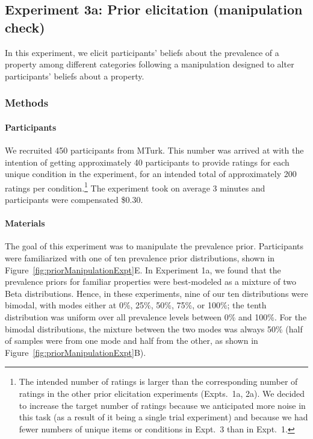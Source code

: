 \documentclass[floatsintext,man]{apa6}
\let\oldparagraph\paragraph
\renewcommand{\paragraph}[1]{\oldparagraph{#1}\mbox{}}
\let\rmarkdownfootnote\footnote%
\def\footnote{\protect\rmarkdownfootnote}
\begin{document}
\hypertarget{experiment-3a-prior-elicitation-manipulation-check}{%
\subsection{Experiment 3a: Prior elicitation (manipulation check)}\label{experiment-3a-prior-elicitation-manipulation-check}}

In this experiment, we elicit participants' beliefs about the prevalence of a property among different categories following a manipulation designed to alter participants' beliefs about a property.


\hypertarget{methods-2}{%
\subsubsection{Methods}\label{methods-2}}

\hypertarget{participants-3}{%
\paragraph{Participants}\label{participants-3}}
%
We recruited 450 participants from MTurk.
This number was arrived at with the intention of getting approximately 40 participants to provide ratings for each unique condition in the experiment, for an intended total of approximately 200 ratings per condition.\footnote{The intended number of ratings is larger than the corresponding number of ratings in the other prior elicitation experiments (Expts.~1a, 2a). We decided to increase the target number of ratings because we anticipated more noise in this task (as a result of it being a single trial experiment) and because we had fewer numbers of unique items or conditions in Expt.~3 than in Expt.~1.}
The experiment took on average 3 minutes and participants were compensated \$0.30.

\hypertarget{materials-1}{%
\paragraph{Materials}\label{materials-1}}
%
The goal of this experiment was to manipulate the prevalence prior.
Participants were familiarized with one of ten prevalence prior distributions, shown in Figure~\ref{fig:priorManipulationExpt}E.
In Experiment 1a, we found that the prevalence priors for familiar properties were best-modeled as a mixture of two Beta distributions.
Hence, in these experiments, nine of our ten distributions were bimodal, with modes either at 0\%, 25\%, 50\%, 75\%, or 100\%; the tenth distribution was uniform over all prevalence levels between 0\% and 100\%.
For the bimodal distributions, the mixture between the two modes was always 50\% (half of samples were from one mode and half from the other, as shown in Figure~\ref{fig:priorManipulationExpt}B).
\end{document}
